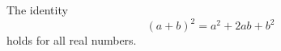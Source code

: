 \documentclass{article}
\begin{document}
The identity
$$ (a+b)^2 = a^2 + 2ab + b^2 $$
holds for all real numbers.
\end{document}
